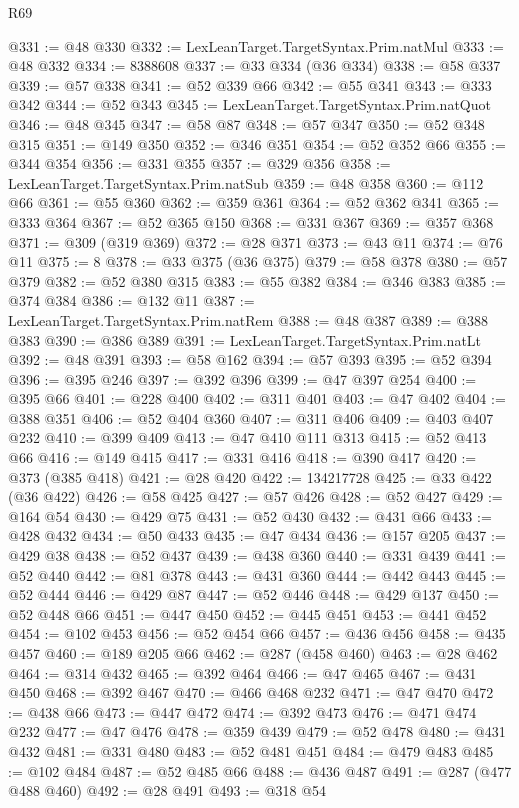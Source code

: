 \begin{lexlean}{R69}
\begin{coremodule}
@331 := @48 @330
@332 := LexLeanTarget.TargetSyntax.Prim.natMul
@333 := @48 @332
@334 := 8388608
@337 := @33 @334 (@36 @334)
@338 := @58 @337
@339 := @57 @338
@341 := @52 @339 @66
@342 := @55 @341
@343 := @333 @342
@344 := @52 @343
@345 := LexLeanTarget.TargetSyntax.Prim.natQuot
@346 := @48 @345
@347 := @58 @87
@348 := @57 @347
@350 := @52 @348 @315
@351 := @149 @350
@352 := @346 @351
@354 := @52 @352 @66
@355 := @344 @354
@356 := @331 @355
@357 := @329 @356
@358 := LexLeanTarget.TargetSyntax.Prim.natSub
@359 := @48 @358
@360 := @112 @66
@361 := @55 @360
@362 := @359 @361
@364 := @52 @362 @341
@365 := @333 @364
@367 := @52 @365 @150
@368 := @331 @367
@369 := @357 @368
@371 := @309 (@319 @369)
@372 := @28 @371
@373 := @43 @11
@374 := @76 @11
@375 := 8
@378 := @33 @375 (@36 @375)
@379 := @58 @378
@380 := @57 @379
@382 := @52 @380 @315
@383 := @55 @382
@384 := @346 @383
@385 := @374 @384
@386 := @132 @11
@387 := LexLeanTarget.TargetSyntax.Prim.natRem
@388 := @48 @387
@389 := @388 @383
@390 := @386 @389
@391 := LexLeanTarget.TargetSyntax.Prim.natLt
@392 := @48 @391
@393 := @58 @162
@394 := @57 @393
@395 := @52 @394
@396 := @395 @246
@397 := @392 @396
@399 := @47 @397 @254
@400 := @395 @66
@401 := @228 @400
@402 := @311 @401
@403 := @47 @402
@404 := @388 @351
@406 := @52 @404 @360
@407 := @311 @406
@409 := @403 @407 @232
@410 := @399 @409
@413 := @47 @410 @111 @313
@415 := @52 @413 @66
@416 := @149 @415
@417 := @331 @416
@418 := @390 @417
@420 := @373 (@385 @418)
@421 := @28 @420
@422 := 134217728
@425 := @33 @422 (@36 @422)
@426 := @58 @425
@427 := @57 @426
@428 := @52 @427
@429 := @164 @54
@430 := @429 @75
@431 := @52 @430
@432 := @431 @66
@433 := @428 @432
@434 := @50 @433
@435 := @47 @434
@436 := @157 @205
@437 := @429 @38
@438 := @52 @437
@439 := @438 @360
@440 := @331 @439
@441 := @52 @440
@442 := @81 @378
@443 := @431 @360
@444 := @442 @443
@445 := @52 @444
@446 := @429 @87
@447 := @52 @446
@448 := @429 @137
@450 := @52 @448 @66
@451 := @447 @450
@452 := @445 @451
@453 := @441 @452
@454 := @102 @453
@456 := @52 @454 @66
@457 := @436 @456
@458 := @435 @457
@460 := @189 @205 @66
@462 := @287 (@458 @460)
@463 := @28 @462
@464 := @314 @432
@465 := @392 @464
@466 := @47 @465
@467 := @431 @450
@468 := @392 @467
@470 := @466 @468 @232
@471 := @47 @470
@472 := @438 @66
@473 := @447 @472
@474 := @392 @473
@476 := @471 @474 @232
@477 := @47 @476
@478 := @359 @439
@479 := @52 @478
@480 := @431 @432
@481 := @331 @480
@483 := @52 @481 @451
@484 := @479 @483
@485 := @102 @484
@487 := @52 @485 @66
@488 := @436 @487
@491 := @287 (@477 @488 @460)
@492 := @28 @491
@493 := @318 @54

\end{coremodule}
\end{lexlean}
